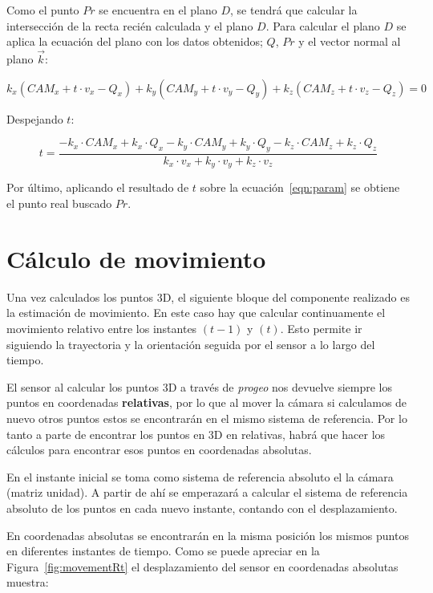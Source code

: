 Como el punto $Pr$ se encuentra en el plano $D$, se tendrá que calcular la intersección de la recta recién calculada y el plano $D$. Para calcular el plano $D$ se aplica la ecuación del plano con los datos obtenidos; $Q$, $Pr$ y el vector normal al plano $\vec{k}$:

\begin{equation}
k_{x}(CAM_{x}+t\cdot v_{x}-Q_{x})+k_{y}(CAM_{y}+t\cdot v_{y}-Q_{y})+k_{z}(CAM_{z}+t\cdot v_{z}-Q_{z})=0
\end{equation}

Despejando $t$:

\begin{equation}
t=\frac{-k_{x}\cdot CAM_{x}+k_{x}\cdot Q_{x}-k_{y}\cdot CAM_{y}+k_{y}\cdot Q_{y}-k_{z}\cdot CAM_{z}+k_{z}\cdot Q_{z}}{k_{x}\cdot v_{x}+k_{y}\cdot v_{y}+k_{z}\cdot v_{z}}
\end{equation}

Por último, aplicando el resultado de $t$ sobre la ecuación~\ref{eqn:param} se obtiene el punto real buscado $Pr$.

\section{Cálculo de movimiento}

Una vez calculados los puntos 3D, el siguiente bloque del componente realizado es la estimación de movimiento. En este caso hay que calcular continuamente el movimiento relativo entre los instantes $(t-1)$ y $(t)$. Esto permite ir siguiendo la trayectoria y la orientación seguida por el sensor a lo largo del tiempo.

El sensor al calcular los puntos 3D a través de \textit{progeo} nos devuelve siempre los puntos en coordenadas \textbf{relativas}, por lo que al mover la cámara si calculamos de nuevo otros puntos estos se encontrarán en el mismo sistema de referencia. Por lo tanto a parte de encontrar los puntos en 3D en relativas, habrá que hacer los cálculos para encontrar esos puntos en coordenadas absolutas.

En el instante inicial se toma como sistema de referencia absoluto el la cámara (matriz unidad). A partir de ahí se emperazará a calcular el sistema de referencia absoluto de los puntos en cada nuevo instante, contando con el desplazamiento.

En coordenadas absolutas se encontrarán en la misma posición los mismos puntos en diferentes instantes de tiempo. Como se puede apreciar en la Figura~\ref{fig:movementRt} el desplazamiento del sensor en coordenadas absolutas muestra:


